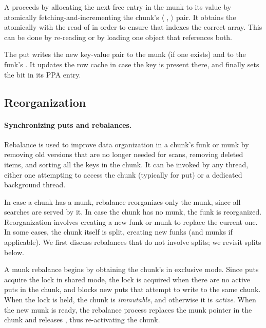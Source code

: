 A  proceeds by allocating the next free entry in 
the munk to its value by atomically fetching-and-incrementing the chunk's 
$\langle$ ,  $\rangle$ pair. It obtains the  atomically with 
the read of  in order to ensure that  indexes the correct array. 
This can be done by re-reading   or by loading one object that references both.

The put writes the new key-value pair to the munk (if one exists) and to the funk's . 
It updates the row cache in case the key is present there, and finally sets the  bit in its PPA entry.


\subsection{Reorganization}
\label{ssec:rebalance}

\paragraph{Synchronizing puts and rebalances.}

Rebalance is used to improve data organization in a chunk's funk or munk by removing old versions that are no longer needed for scans, 
removing deleted items, and sorting all the keys in the chunk. 
It can be invoked by any thread, either one attempting to access the chunk (typically for put) or a dedicated background thread.

In case a chunk has a munk, rebalance reorganizes only  the munk, since all searches are served by it. In case the chunk has no munk, the funk is reorganized. Reorganization involves creating a new funk or munk 
to replace the  current one.  In some cases, the chunk itself is split, creating new funks (and munks if applicable). We first discuss 
rebalances that do not involve splits; we revisit splits below.

A munk rebalance begins by obtaining the chunk's  in exclusive mode. Since puts acquire the lock in shared mode,
the lock is acquired when there are no active puts in the chunk, and blocks new puts that attempt to write to the same chunk. 
When the lock is held, the chunk is \emph{immutable}, and otherwise it is \emph{active}. 
When the new munk is ready, the rebalance process replaces the munk pointer in the chunk and releases , thus 
re-activating the chunk.

